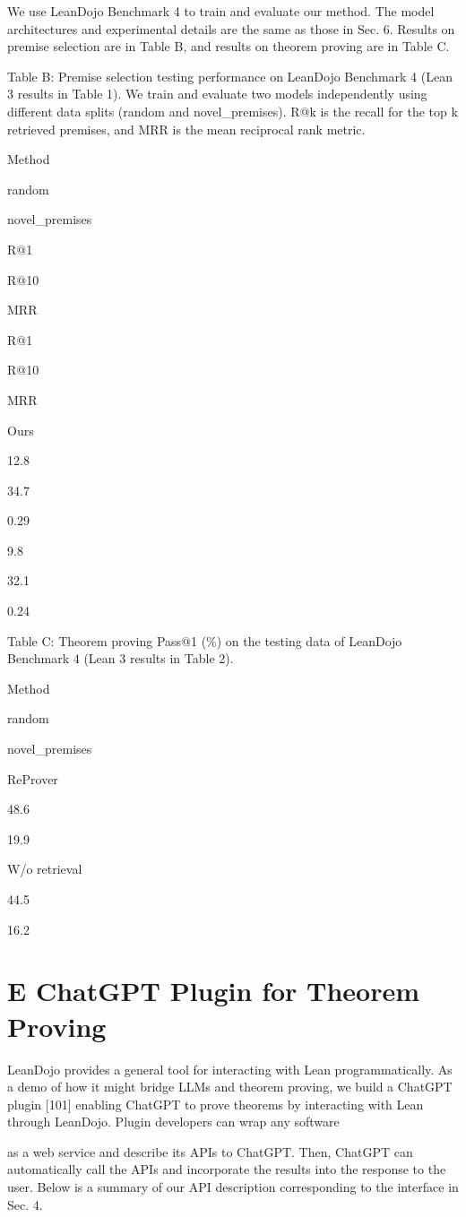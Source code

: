 \documentclass[
]{article}
\begin{document}
We use LeanDojo Benchmark 4 to train and evaluate our method. The model
architectures and experimental details are the same as those in Sec. 6.
Results on premise selection are in Table B, and results on theorem
proving are in Table C.

Table B: Premise selection testing performance on LeanDojo Benchmark 4
(Lean 3 results in Table 1). We train and evaluate two models
independently using different data splits (random and novel\_premises).
R@k is the recall for the top k retrieved premises, and MRR is the mean
reciprocal rank metric.

Method

random

novel\_premises

R@1

R@10

MRR

R@1

R@10

MRR

Ours

12.8

34.7

0.29

9.8

32.1

0.24

Table C: Theorem proving Pass@1 (\%) on the testing data of LeanDojo
Benchmark 4 (Lean 3 results in Table 2).

Method

random

novel\_premises

ReProver

48.6

19.9

W/o retrieval

44.5

16.2

\section{E ChatGPT Plugin for Theorem
Proving}\label{e-chatgpt-plugin-for-theorem-proving}

LeanDojo provides a general tool for interacting with Lean
programmatically. As a demo of how it might bridge LLMs and theorem
proving, we build a ChatGPT plugin {[}101{]} enabling ChatGPT to prove
theorems by interacting with Lean through LeanDojo. Plugin developers
can wrap any software

as a web service and describe its APIs to ChatGPT. Then, ChatGPT can
automatically call the APIs and incorporate the results into the
response to the user. Below is a summary of our API description
corresponding to the interface in Sec. 4.
\end{document}
